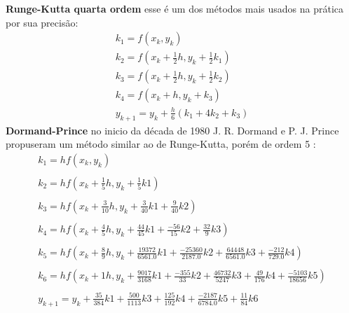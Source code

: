 \textbf{Runge-Kutta quarta ordem} esse é um dos métodos mais usados na prática por sua precisão:
\begin{equation*}
\begin{split}
k_{1} = f(x_{k}, y_{k})\\
k_{2} = f(x_{k} + \frac{1}{2}h, y_{k} + \frac{1}{2}k_{1})\\
k_{3} = f(x_{k} + \frac{1}{2}h, y_{k} + \frac{1}{2}k_{2})\\
k_{4} = f(x_{k} + h, y_{k} + k_{3})\\
y_{k+1} = y_{k} + \frac{h}{6}(k_{1} + 4k_{2} + k_{3})
\end{split}
\end{equation*}
\textbf{Dormand-Prince} no inicio da década de 1980 J. R. Dormand e P. J. Prince propuseram um método similar
ao de Runge-Kutta, porém de ordem 5 \cite{filho2007algoritmos}:
\begin{equation*}
\begin{split}
	k_{1} = hf(x_{k}, y_{k})\\
	\\
    k_{2} = hf(x_{k} + \frac{1}{5}h, y_{k} + \frac{1}{5}k1  )\\
    \\
    k_{3} = hf(x_{k} + \frac{3}{10}h, y_{k} + \frac{3}{40}k1 + \frac{9}{40}k2 )\\
    \\
    k_{4} = hf(x_{k} + \frac{4}{5}h, y_{k} + \frac{44}{45}k1 + \frac{-56}{15}k2 + \frac{32}{9}k3 )\\
    \\
    k_{5} = hf(x_{k} + \frac{8}{9}h, y_{k} + \frac{19372}{6561.0}k1 + \frac{-25360}{2187.0}k2 + \frac{64448}{6561.0}k3 + \frac{-212}{729.0}k4 )\\
    \\
    k_{6} = hf(x_{k} + 1h, y_{k} + \frac{9017}{3168}k1 + \frac{-355}{33}k2 + \frac{46732}{5247}k3 + \frac{49}{176}k4 + \frac{-5103}{18656}k5 )\\
    \\
    y_{k+1} = y_{k} + \frac{35}{384}k1 + \frac{500}{1113}k3 + \frac{125}{192}k4 + \frac{-2187}{6784.0}k5 + \frac{11}{84}k6
\end{split}
\end{equation*}

